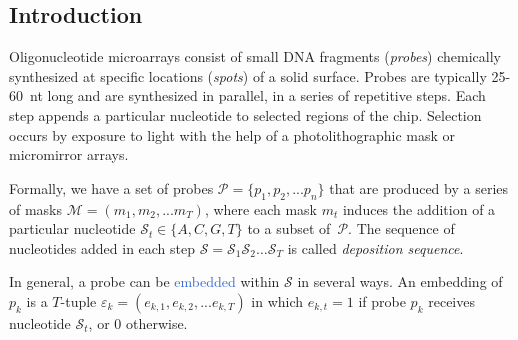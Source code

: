 \documentclass[portrait]{a0poster}
\newcommand{\ds}{\mathcal{S}}
\begin{document}
\sffamily				%
\large					%
\setlength{\columnsep}{96pt}		%
\setlength{\columnseprule}{1pt}		%
\setlength{\multicolsep}{96pt}		%

\begin{multicols}{3}[\aggiheader]


\setlength{\parskip}{5mm}

\section*{\textcolor{aggigreen}{Introduction}}

\noindent Oligonucleotide microarrays consist of small DNA fragments
(\emph{probes}) chemically synthesized at specific locations (\emph{spots}) of
a solid surface. Probes are typically 25-60~nt long and are synthesized
in parallel, in a series of repetitive steps. Each step appends a particular
nucleotide to selected regions of the chip. Selection occurs by exposure to
light with the help of a photolithographic mask or micromirror arrays.

\noindent Formally, we have a set of probes
$\mathcal{P} = \{p_{1}, p_{2}, ... p_{n}\}$ that are produced by a series of
masks $\mathcal{M} = (m_{1}, m_{2}, ... m_T)$, where each mask $m_{t}$ induces
the addition of a particular nucleotide $\ds_{t} \in \{A, C, G, T\}$ to a subset
of~$\mathcal{P}$. The sequence of nucleotides added in each step
$\ds = \ds_{1} \ds_{2} \ldots \ds_{T}$ is called \emph{deposition sequence}.

\noindent In general, a probe can be \textcolor{highlight}{embedded} within
$\mathcal{S}$ in several ways. An embedding of $p_k$ is a $T$-tuple
$\varepsilon_{k} = (e_{k,1}, e_{k,2}, ... e_{k,T})$ in which $e_{k,t} = 1$ if
probe $p_{k}$ receives nucleotide $\ds_t$, or 0 otherwise.


\end{multicols}
\end{document}
